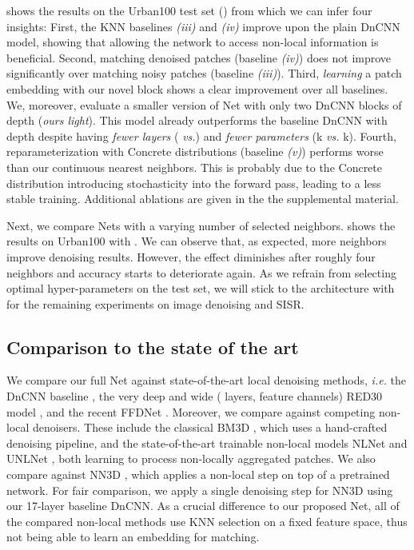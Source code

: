 \documentclass{article}
\makeatletter
\newcommand{\vs}{\emph{vs.}\@\xspace}
\newcommand{\ie}{\emph{i.\thinspace{}e.}\@\xspace}
\makeatother
\begin{document}
 shows the results on the Urban100 test set () from which we can infer four insights:
First, the KNN baselines \emph{(iii)} and \emph{(iv)} improve upon the plain DnCNN model, showing that allowing the network to access non-local information is beneficial.
Second, matching denoised patches (baseline \emph{(iv)}) does not improve significantly over matching noisy patches (baseline \emph{(iii)}).
Third, \emph{learning} a patch embedding with our novel  block shows a clear improvement over all baselines.
 We, moreover, evaluate a smaller version of Net with only two DnCNN blocks of depth  (\emph{ours light}). 
This model already outperforms the baseline DnCNN with depth  despite having \emph{fewer layers} ( \vs ) and \emph{fewer parameters} (k \vs k).
Fourth, reparameterization with Concrete distributions (baseline \emph{(v)}) performs worse than our continuous nearest neighbors. 
This is probably due to the Concrete distribution introducing stochasticity into the forward pass, leading to a less stable training.
Additional ablations are given in the the supplemental material.


Next, we compare Nets with a varying number of selected neighbors. 
 shows the results on Urban100 with . 
We can observe that, as expected, more neighbors improve denoising results.
However, the effect diminishes after roughly four neighbors and accuracy starts to deteriorate again.
As we refrain from selecting optimal hyper-parameters on the test set, we will stick to the architecture with  for the remaining experiments on image denoising and SISR.
 

\subsection{Comparison to the state of the art}
We compare our full Net
against state-of-the-art local denoising methods, \ie 
the DnCNN baseline \cite{Zhang:2017:BGD}, the very deep and wide ( layers,  feature channels) RED30 model \cite{Mao:2016:IRU}, and the recent FFDNet \cite{Zhang:2018:FFD}.
 Moreover, we compare against competing non-local denoisers.
These include the classical BM3D \cite{Dabov:2006:IDB}, which uses a hand-crafted
denoising pipeline, and the state-of-the-art trainable non-local models NLNet \cite{Lefkimmiatis:2017:NLC} and UNLNet \cite{Lefkimmiatis:2018:UDN},
both learning to process non-locally aggregated patches.
We also compare against NN3D \cite{Cruz:2018:NRC}, which applies a non-local step on top of a pretrained network. 
For fair comparison, we apply a single denoising step for NN3D using our 17-layer baseline DnCNN.
As a crucial difference to our proposed Net, all of the compared non-local methods use KNN selection on a fixed feature space, thus not being able to learn an embedding for matching. 
\end{document}
